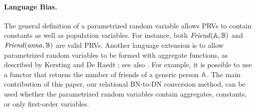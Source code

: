 \documentclass[runningheads,a4paper]{llncs}
\newcommand{\fixneeded}[1]{\textbf{[\footnotesize #1]}}
\begin{document}
\paragraph{Language Bias.}
The general definition of a parametrized random variable allows PRVs to contain constants as well as population variables. For instance, both $\it{Friend}(\mathbb{A},\mathbb{B})$ and $\it{Friend}(\it{anna},\mathbb{B})$ are valid PRVs. Another language extension is to allow parametrized random variables to be formed with aggregate functions, as described by Kersting and De Raedt \cite{Kersting2007}; see also \cite{Ravkic2015}. For example, it is possible to use a functor that returns the number of friends of a generic person $\mathbb{A}$. The main contribution of this paper, our relational BN-to-DN conversion method, can be used whether the parametrized random variables contain aggregates, constants, or only first-order variables. 


\end{document}
